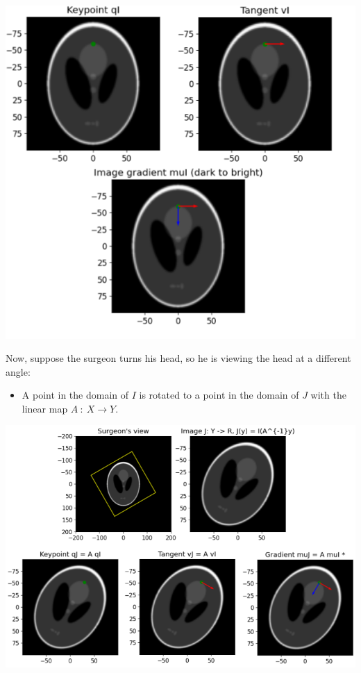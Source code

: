 \documentclass[10pt]{article}
\begin{document}
\begin{center}
    \includegraphics*[scale=0.9]{W2_3.png}
\end{center}
Now, suppose the surgeon turns his head, so he is viewing the head at a different angle:
\begin{itemize}
    \item A point in the domain of $I$ is rotated to a point in the domain of $J$ with the linear map $A\::\: X \rightarrow Y$.
\end{itemize}
\begin{center}
    \includegraphics*[width=\textwidth]{W2_4.png}
\end{center}
\end{document}

